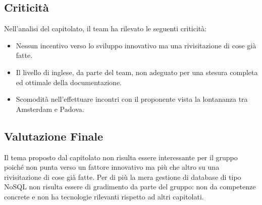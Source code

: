 \subsection{Criticità}
Nell’analisi del capitolato, il team ha rilevato le seguenti criticità:
\begin{itemize}
	\item Nessun incentivo verso lo sviluppo innovativo ma una rivisitazione di cose già fatte. 
	\item Il livello di inglese, da parte del team, non adeguato per una stesura completa ed ottimale della documentazione. 	
	\item Scomodità nell'effettuare incontri con il proponente vista la lontananza tra Amsterdam e Padova.
\end{itemize}

\subsection{Valutazione Finale}
Il tema proposto dal capitolato non risulta essere interessante per il gruppo poiché non punta verso un fattore innovativo ma più che altro su una rivisitazione di cose già fatte. 
Per di più la mera gestione di database di tipo NoSQL non risulta essere di gradimento da parte del gruppo: non da competenze concrete e non ha tecnologie rilevanti rispetto ad altri capitolati. 

